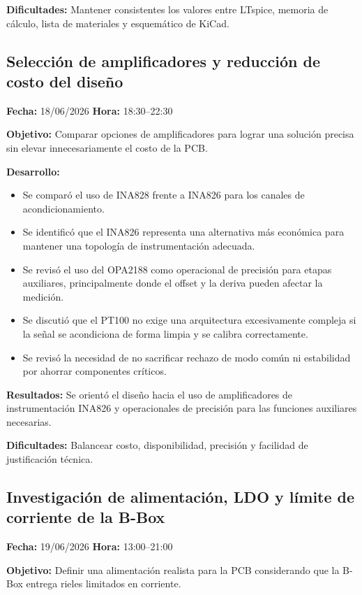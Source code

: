 \documentclass[12pt]{article}
\begin{document}
\textbf{Dificultades:}
Mantener consistentes los valores entre LTspice, memoria de cálculo, lista de materiales y esquemático de KiCad.

\subsection{Selección de amplificadores y reducción de costo del diseño}
\textbf{Fecha:} 18/06/2026 \quad \textbf{Hora:} 18:30--22:30

\textbf{Objetivo:}
Comparar opciones de amplificadores para lograr una solución precisa sin elevar innecesariamente el costo de la PCB.

\textbf{Desarrollo:}
\begin{itemize}
\item Se comparó el uso de INA828 frente a INA826 para los canales de acondicionamiento.
\item Se identificó que el INA826 representa una alternativa más económica para mantener una topología de instrumentación adecuada.
\item Se revisó el uso del OPA2188 como operacional de precisión para etapas auxiliares, principalmente donde el offset y la deriva pueden afectar la medición.
\item Se discutió que el PT100 no exige una arquitectura excesivamente compleja si la señal se acondiciona de forma limpia y se calibra correctamente.
\item Se revisó la necesidad de no sacrificar rechazo de modo común ni estabilidad por ahorrar componentes críticos.
\end{itemize}

\textbf{Resultados:}
Se orientó el diseño hacia el uso de amplificadores de instrumentación INA826 y operacionales de precisión para las funciones auxiliares necesarias.

\textbf{Dificultades:}
Balancear costo, disponibilidad, precisión y facilidad de justificación técnica.

\subsection{Investigación de alimentación, LDO y límite de corriente de la B-Box}
\textbf{Fecha:} 19/06/2026 \quad \textbf{Hora:} 13:00--21:00

\textbf{Objetivo:}
Definir una alimentación realista para la PCB considerando que la B-Box entrega rieles limitados en corriente.
\end{document}
